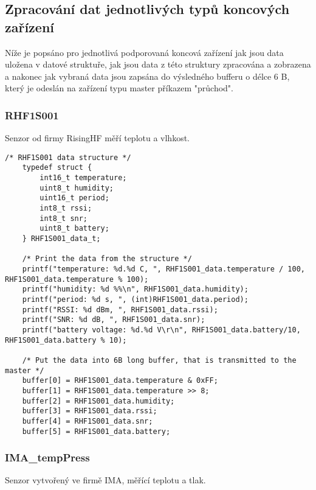 \subsection{Zpracování dat jednotlivých typů koncových zařízení}
Níže je popsáno pro jednotlivá podporovaná koncová zařízení jak jsou data uložena v datové struktuře, jak jsou data z této struktury zpracována a zobrazena a nakonec jak vybraná data jsou zapsána do výsledného bufferu o délce 6 B, který je odeslán na zařízení typu master příkazem "průchod".

\subsubsection{RHF1S001}
Senzor od firmy RisingHF měří teplotu a vlhkost.

\begin{lstlisting}[style=CStyle]
    /* RHF1S001 data structure */   
    typedef struct {
        int16_t temperature;
        uint8_t humidity;
        uint16_t period;
        int8_t rssi;
        int8_t snr;
        uint8_t battery;
    } RHF1S001_data_t;

    /* Print the data from the structure */
    printf("temperature: %d.%d C, ", RHF1S001_data.temperature / 100, RHF1S001_data.temperature % 100);
    printf("humidity: %d %%\n", RHF1S001_data.humidity);
    printf("period: %d s, ", (int)RHF1S001_data.period);
    printf("RSSI: %d dBm, ", RHF1S001_data.rssi);
    printf("SNR: %d dB, ", RHF1S001_data.snr);
    printf("battery voltage: %d.%d V\r\n", RHF1S001_data.battery/10, RHF1S001_data.battery % 10);

    /* Put the data into 6B long buffer, that is transmitted to the master */
    buffer[0] = RHF1S001_data.temperature & 0xFF;
    buffer[1] = RHF1S001_data.temperature >> 8;
    buffer[2] = RHF1S001_data.humidity;
    buffer[3] = RHF1S001_data.rssi;
    buffer[4] = RHF1S001_data.snr;
    buffer[5] = RHF1S001_data.battery;
\end{lstlisting}


\subsubsection{IMA\_tempPress}
Senzor vytvořený ve firmě IMA, měřící teplotu a tlak.

